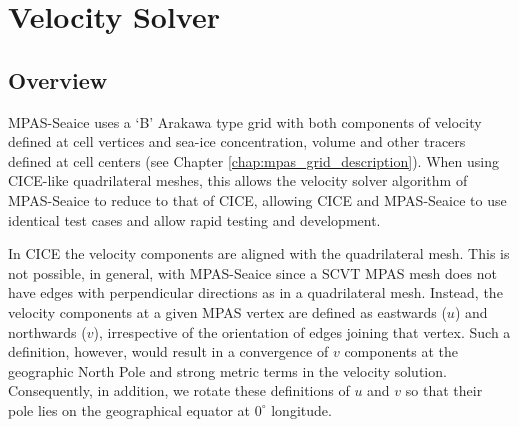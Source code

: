 \section{Velocity Solver}
\label{sec:velocity_solver}

\subsection{Overview}

MPAS-Seaice uses a `B' Arakawa type grid \citep{Arakawa77} with both components of velocity defined at cell vertices and sea-ice concentration, volume and other tracers defined at cell centers (see Chapter \ref{chap:mpas_grid_description}). When using CICE-like quadrilateral meshes, this allows the velocity solver algorithm of MPAS-Seaice to reduce to that of CICE, allowing CICE and MPAS-Seaice to use identical test cases and allow rapid testing and development. 

In CICE the velocity components are aligned with the quadrilateral mesh. This is not possible, in general, with MPAS-Seaice since a SCVT MPAS mesh does not have edges with perpendicular directions as in a quadrilateral mesh. Instead, the velocity components at a given MPAS vertex are defined as eastwards ($u$) and northwards ($v$), irrespective of the orientation of edges joining that vertex. Such a definition, however, would result in a convergence of $v$ components at the geographic North Pole and strong metric terms in the velocity solution. Consequently, in addition, we rotate these definitions of $u$ and $v$ so that their pole lies on the geographical equator at $0^\circ$ longitude. 

